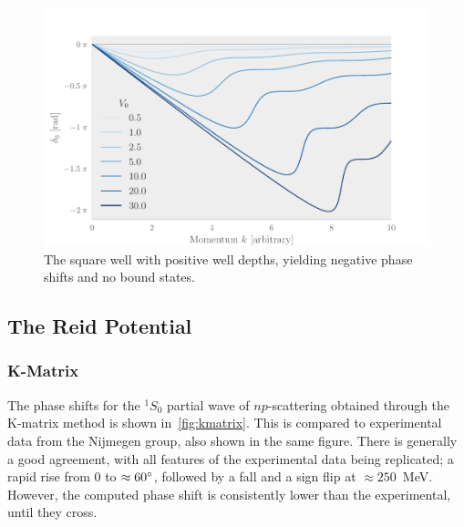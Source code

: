 \begin{figure}[ht!]
  \centering
  \includegraphics[]{Figures/positive_square_well.pdf}
  \caption{\label{fig:positivesquare}The square well with positive well depths,
    yielding negative phase shifts and no bound states.}
\end{figure}


\subsection{The Reid Potential}


\subsubsection{K-Matrix}
The phase shifts for the \(^{1}S_{0}\) partial wave of \(np\)-scattering
obtained through the K-matrix method is shown 
in~\cref{fig:kmatrix}. This is compared to experimental data from the Nijmegen
group\cite{PhysRevC.48.792}, also shown in the same figure. There is generally a
good agreement, with all features of the experimental data being replicated; a
rapid rise from 0 to \(\approx 60\degree\), followed by a fall and a sign flip
at \mbox{\(\approx 250\) MeV}. However, the computed phase shift is consistently lower
than the experimental, until they cross.

